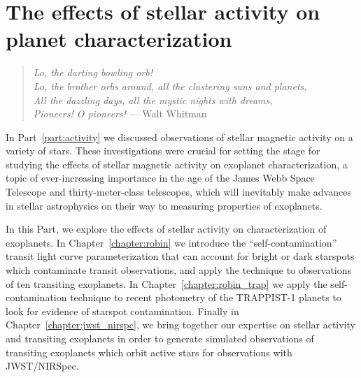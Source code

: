 \documentclass[12pt, twoside]{uwthesis}
\begin{document}
%
%
%
%
%
%
%
%
%
%
%

\part{The effects of stellar activity on planet characterization} \label{part:synthesis}

\begin{verse}
{\it Lo, the darting bowling orb!\\
Lo, the brother orbs around, all the clustering suns and planets,\\
All the dazzling days, all the mystic nights with dreams,\\
Pioneers! O pioneers!}
\hfill --- Walt Whitman
\end{verse}

In Part~\ref{part:activity} we discussed observations of stellar magnetic activity on a variety of stars. %
These investigations were crucial for setting the stage for studying the effects of stellar magnetic activity on exoplanet characterization, a topic of ever-increasing importance in the age of the James Webb Space Telescope and thirty-meter-class telescopes, which will inevitably make advances in stellar astrophysics on their way to measuring properties of exoplanets.  

In this Part, we explore the effects of stellar activity on characterization of exoplanets. In Chapter~\ref{chapter:robin} we introduce the ``self-contamination'' transit light curve parameterization that can account for bright or dark starspots which contaminate transit observations, and apply the technique to observations of ten transiting exoplanets. In Chapter~\ref{chapter:robin_trap} we apply the self-contamination technique to recent \spitzer photometry of the TRAPPIST-1 planets to look for evidence of starspot contamination. Finally in Chapter~\ref{chapter:jwst_nirspc}, we bring together our expertise on stellar activity and transiting exoplanets in order to generate simulated observations of transiting exoplanets which orbit active stars for observations with JWST/NIRSpec.  
\end{document}
